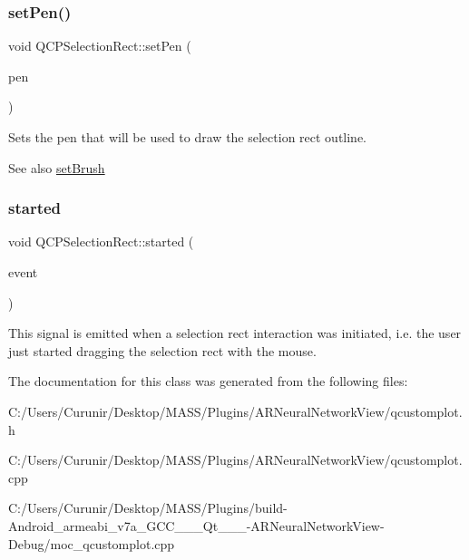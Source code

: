 \subsubsection{\texorpdfstring{set\+Pen()}{setPen()}}
{\footnotesize\ttfamily void Q\+C\+P\+Selection\+Rect\+::set\+Pen (\begin{DoxyParamCaption}\item[{const Q\+Pen \&}]{pen }\end{DoxyParamCaption})}

Sets the pen that will be used to draw the selection rect outline.

\begin{DoxySeeAlso}{See also}
\hyperlink{class_q_c_p_selection_rect_ab0c66f1484418782efa01f4153611080}{set\+Brush} 
\end{DoxySeeAlso}
\mbox{\label{class_q_c_p_selection_rect_a7b7162d19f4f2174d3644ff1a5d335aa}} 
\subsubsection{\texorpdfstring{started}{started}}
{\footnotesize\ttfamily void Q\+C\+P\+Selection\+Rect\+::started (\begin{DoxyParamCaption}\item[{Q\+Mouse\+Event $\ast$}]{event }\end{DoxyParamCaption})\hspace{0.3cm}{\ttfamily [signal]}}

This signal is emitted when a selection rect interaction was initiated, i.\+e. the user just started dragging the selection rect with the mouse. 

The documentation for this class was generated from the following files\+:\begin{DoxyCompactItemize}
\item 
C\+:/\+Users/\+Curunir/\+Desktop/\+M\+A\+S\+S/\+Plugins/\+A\+R\+Neural\+Network\+View/qcustomplot.\+h\item 
C\+:/\+Users/\+Curunir/\+Desktop/\+M\+A\+S\+S/\+Plugins/\+A\+R\+Neural\+Network\+View/qcustomplot.\+cpp\item 
C\+:/\+Users/\+Curunir/\+Desktop/\+M\+A\+S\+S/\+Plugins/build-\/\+Android\+\_\+armeabi\+\_\+v7a\+\_\+\+G\+C\+C\+\_\+\_\+\_\+\+Qt\+\_\+\_\+\_-\/\+A\+R\+Neural\+Network\+View-\/\+Debug/moc\+\_\+qcustomplot.\+cpp\end{DoxyCompactItemize}
